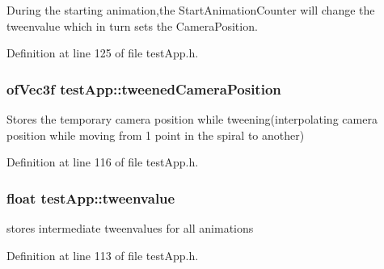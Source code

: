 During the starting animation,the Start\-Animation\-Counter will change the tweenvalue which in turn sets the Camera\-Position. 



Definition at line 125 of file test\-App.\-h.

\hypertarget{group___camera_animation_gae9f60797c1c5d9f1ac06e1d6a5259957}{
\subsubsection[{tweened\-Camera\-Position}]{\setlength{\rightskip}{0pt plus 5cm}of\-Vec3f test\-App\-::tweened\-Camera\-Position}}\label{group___camera_animation_gae9f60797c1c5d9f1ac06e1d6a5259957}


Stores the temporary camera position while tweening(interpolating camera position while moving from 1 point in the spiral to another) 



Definition at line 116 of file test\-App.\-h.

\hypertarget{group___camera_animation_gadd9ab1aa902948afbdf1c6db0dfde385}{
\subsubsection[{tweenvalue}]{\setlength{\rightskip}{0pt plus 5cm}float test\-App\-::tweenvalue}}\label{group___camera_animation_gadd9ab1aa902948afbdf1c6db0dfde385}


stores intermediate tweenvalues for all animations 



Definition at line 113 of file test\-App.\-h.

